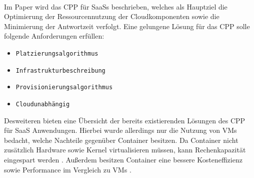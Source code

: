 \paragraph{}
Im Paper \cite{Bousselmi2014} wird das \ac{CPP} für \acp{SaaS} beschrieben, welches als Hauptziel die Optimierung der Ressourcennutzung
der Cloudkomponenten sowie die Minimierung der Antwortzeit verfolgt.
Eine gelungene Lösung für das \ac{CPP} solle folgende Anforderungen erfüllen:
\begin{itemize}
  \item \texttt{Platzierungsalgorithmus}
  \item \texttt{Infrastrukturbeschreibung}
  \item \texttt{Provisionierungsalgorithmus}
  \item \texttt{Cloudunabhängig}
\end{itemize}
Desweiteren bieten \citeauthor{Bousselmi2014} eine Übersicht der bereits existierenden Lösungen des \ac{CPP} für \ac{SaaS} Anwendungen.
Hierbei wurde allerdings nur die Nutzung von \acfp{VM} bedacht, welche Nachteile gegenüber Container besitzen.
Da Container nicht zusätzlich Hardware sowie Kernel virtualisieren müssen, kann Rechenkapazität eingespart werden \cite{seo2014performance}.
Außerdem besitzen Container eine bessere Kosteneffizienz sowie Performance im Vergleich zu \acp{VM} \cite{soltesz2007container}.
